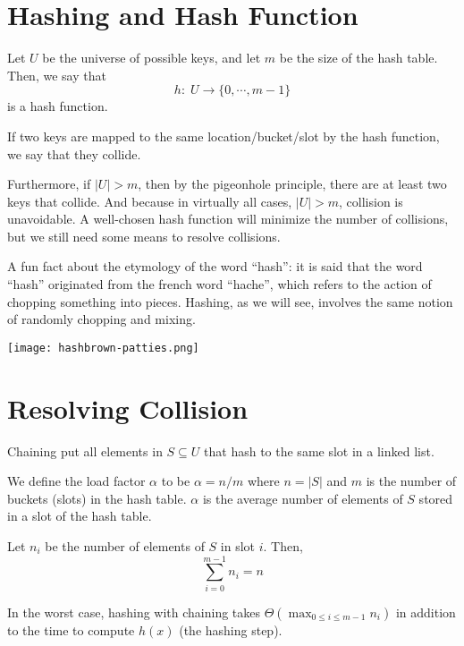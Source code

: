\section{Hashing and Hash Function} 

Let $U$ be the universe of possible keys, and let $m$ be the size of the hash table. Then, we say that
$$
h:\; U \to \{0, \cdots, m-1 \}
$$
is a hash function.

If two keys are mapped to the same location/bucket/slot by the hash function, we say that they collide.

Furthermore, if $|U| > m$, then by the pigeonhole principle, there are at least two keys that collide. And because in virtually all cases, $|U| > m$, collision is unavoidable. A well-chosen hash function will minimize the number of collisions, but we still need some means to resolve collisions.

\begin{remark}
    \begin{minipage}{0.8\linewidth}
        A fun fact about the etymology of the word ``hash'': it is said that the word ``hash'' originated from the french word ``hache'', which refers to the action of chopping something into pieces. Hashing, as we will see, involves the same notion of randomly chopping and mixing.
    \end{minipage}
    \hspace{1em}
    \begin{minipage}{0.2\linewidth}
        \texttt{[image: hashbrown-patties.png]}
    \end{minipage}
\end{remark}

\section{Resolving Collision}

Chaining put all elements in $S \subseteq U$ that hash to the same slot in a linked list.

We define the load factor $\alpha$ to be $\alpha = n/m$ where $n = |S|$ and $m$ is the number of buckets (slots) in the hash table. $\alpha$ is the average number of elements of $S$ stored in a slot of the hash table.

Let $n_i$ be the number of elements of $S$ in slot $i$. Then,
$$
\sum_{i=0}^{m-1} n_i = n
$$

In the worst case, hashing with chaining takes $\Theta(\max_{0 \leq i \leq m-1} n_i)$ in addition to the time to compute $h(x)$ (the hashing step).

